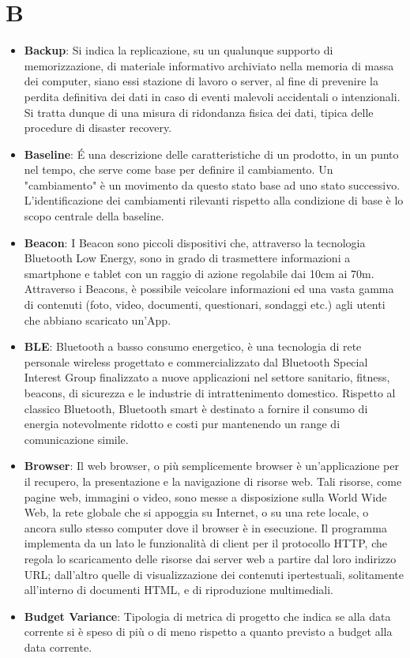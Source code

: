 \section{B}
\begin{itemize} 
	\item
	\textbf{Backup}: Si indica la replicazione, su un qualunque supporto di memorizzazione, di materiale informativo archiviato nella memoria di massa dei computer, siano essi stazione di lavoro o server, al fine di prevenire la perdita definitiva dei dati in caso di eventi malevoli accidentali o intenzionali. Si tratta dunque di una misura di ridondanza fisica dei dati, tipica delle procedure di disaster recovery.
	\item
	\textbf{Baseline}: É una descrizione delle caratteristiche di un prodotto, in un punto nel tempo, che serve come base per definire il cambiamento. Un "cambiamento" è un movimento da questo stato base ad uno stato successivo. L'identificazione dei cambiamenti rilevanti rispetto alla condizione di base è lo scopo centrale della baseline.
	\item
	\textbf{Beacon}: I Beacon sono piccoli dispositivi che, attraverso la tecnologia Bluetooth Low Energy, sono in grado di trasmettere informazioni a smartphone e tablet con un raggio di azione regolabile dai 10cm ai 70m. Attraverso i Beacons, è possibile veicolare informazioni ed una vasta gamma di contenuti (foto, video, documenti, questionari, sondaggi etc.) agli utenti che abbiano scaricato un'App.
	\item
	\textbf{BLE}: Bluetooth a basso consumo energetico, è una tecnologia di rete personale wireless progettato e commercializzato dal Bluetooth Special Interest Group finalizzato a nuove applicazioni nel settore sanitario, fitness, beacons, di sicurezza e le industrie di intrattenimento domestico. Rispetto al classico Bluetooth, Bluetooth smart è destinato a fornire il consumo di energia notevolmente ridotto e costi pur mantenendo un range di comunicazione simile.
	\item
	\textbf{Browser}: Il web browser, o più semplicemente browser è un'applicazione per il recupero, la presentazione e la navigazione di risorse web. Tali risorse, come pagine web, immagini o video, sono messe a disposizione sulla World Wide Web, la rete globale che si appoggia su Internet, o su una rete locale, o ancora sullo stesso computer dove il browser è in esecuzione. Il programma implementa da un lato le funzionalità di client per il protocollo HTTP, che regola lo scaricamento delle risorse dai server web a partire dal loro indirizzo URL; dall'altro quelle di visualizzazione dei contenuti ipertestuali, solitamente all'interno di documenti HTML, e di riproduzione multimediali.
	\item
	\textbf{Budget Variance}: Tipologia di metrica di progetto che indica se alla data corrente si è speso di più o di meno rispetto a quanto previsto a budget alla data corrente. 
	

\end{itemize}